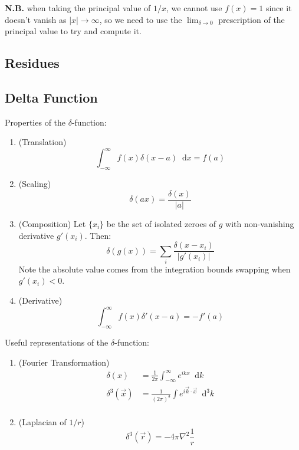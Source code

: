 \documentclass{article}
\newcommand{\diff}{\mathop{}\!\mathrm{d}}
\theoremstyle{definition}
\begin{document}
\textbf{N.B.} when taking the principal value of $1/x$, we cannot use $f(x) = 1$
since it doesn't vanish as $|x| \to \infty$, so we need to use the $\lim_{\delta \to 0}$
prescription of the principal value to try and compute it. 

\subsection{Residues}

\subsection{Delta Function}
Properties of the $\delta$-function:
\begin{enumerate}
	\item (Translation)
		\begin{equation*}
			\int_{-\infty}^\infty f(x) \delta(x - a) \diff x = f(a)
		\end{equation*}
	\item (Scaling)
		\begin{equation*}
			\delta(a x) = \frac{\delta(x)}{|a|}
		\end{equation*}
	\item (Composition) Let $\{x_i\}$ be the set of isolated zeroes of $g$ with
		non-vanishing derivative $g'(x_i)$. Then:
		\begin{equation*}
			\delta(g(x)) = \sum_i \frac{\delta(x-x_i)}{|g'(x_i)|}
		\end{equation*}
		Note the absolute value comes from the integration bounds swapping when
		$g'(x_i) < 0$. 
	\item (Derivative)
		\begin{equation*}
			\int_{-\infty}^\infty f(x) \delta'(x-a) = -f'(a)
		\end{equation*}
\end{enumerate}

Useful representations of the $\delta$-function:
\begin{enumerate}
	\item (Fourier Transformation)
		\begin{equation*}
		\begin{split}
			\delta(x) &= \frac{1}{2\pi} \int_{-\infty}^\infty e^{ikx} \diff k \\
			\delta^3(\vec{x}) &= \frac{1}{(2\pi)^3} \int e^{i\vec{k}\cdot\vec{x}} \diff^3 k \\
		\end{split}
		\end{equation*}
	\item (Laplacian of $1/r$)
		\begin{equation*}
			\delta^3(\vec{r}) = -4\pi\nabla^2 \frac{1}{r}
		\end{equation*}
\end{enumerate}
\end{document}
